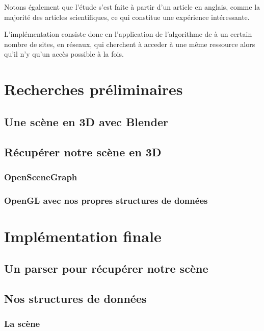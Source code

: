 \documentclass[a4paper,12pt]{report}
\begin{document}
Notons également que l'étude s'est faite à partir d'un article en anglais, comme la majorité des articles scientifiques, ce qui constitue une expérience intéressante.

L'implémentation consiste donc en l'application de l'algorithme de \nt à un certain nombre de sites, en réseaux, qui cherchent à acceder à une même ressource alors qu'il n'y qu'un accès possible à la fois.

\newpage

\chapter{Recherches préliminaires}

\section{Une scène en 3D avec Blender}

\section{Récupérer notre scène en 3D}

\subsection{OpenSceneGraph}

\subsection{OpenGL avec nos propres structures de données}

\chapter{Implémentation finale}

\section{Un parser pour récupérer notre scène}

\section{Nos structures de données}

\subsection{La scène}
\end{document}
